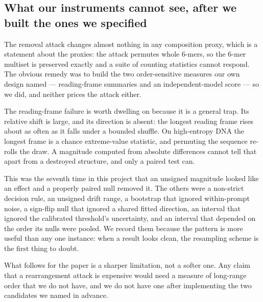 \subsection{What our instruments cannot see, after we built the ones we specified}

The removal attack changes almost nothing in any composition proxy, which is a statement about the
proxies: the attack permutes whole 6-mers, so the 6-mer multiset is preserved exactly and a suite of
counting statistics cannot respond. The obvious remedy was to build the two order-sensitive measures
our own design named --- reading-frame summaries and an independent-model score --- so we did, and
neither prices the attack either.

The reading-frame failure is worth dwelling on because it is a general trap. Its relative shift is
large, and its direction is absent: the longest reading frame rises about as often as it falls under a
bounded shuffle. On high-entropy DNA the longest frame is a chance extreme-value statistic, and
permuting the sequence re-rolls the draw. A magnitude computed from absolute differences cannot tell
that apart from a destroyed structure, and only a paired test can.

This was the seventh time in this project that an unsigned magnitude looked like an effect and a
properly paired null removed it. The others were a non-strict decision rule, an unsigned drift range,
a bootstrap that ignored within-prompt noise, a sign-flip null that ignored a shared fitted direction,
an interval that ignored the calibrated threshold's uncertainty, and an interval that depended on the
order its nulls were pooled. We record them because the pattern is more useful than any one instance:
when a result looks clean, the resampling scheme is the first thing to doubt.

What follows for the paper is a sharper limitation, not a softer one. Any claim that a rearrangement
attack is expensive would need a measure of long-range order that we do not have, and we do not have
one after implementing the two candidates we named in advance.
